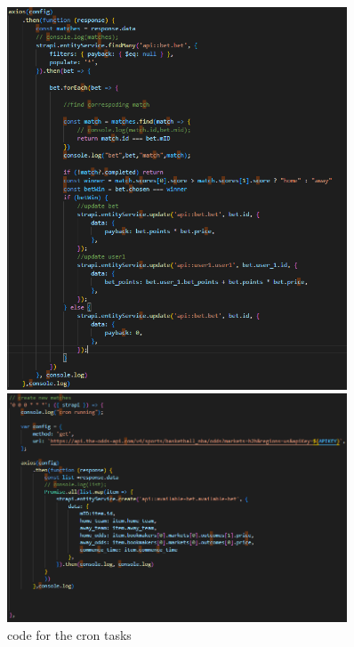 \documentclass[singlecolumn]{article}
\begin{document}
\begin{figure}[H]
    \centering
    \begin{minipage}[c]{0.5\textwidth}
    \centering
    \includegraphics[width=0.9\textwidth]{cron1.png}
    \end{minipage}%
    \begin{minipage}[c]{0.5\textwidth}
    \centering
    \includegraphics[width=0.9\textwidth]{cron2.png}
    \end{minipage}%
    \caption{code for the cron tasks}
\end{figure}
\end{document}
